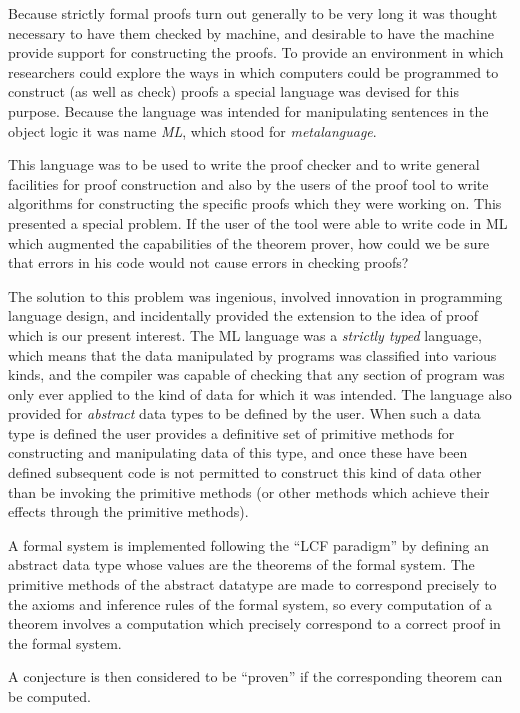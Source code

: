 Because strictly formal proofs turn out generally to be very long it was thought necessary to have them checked by machine, and desirable to have the machine provide support for constructing the proofs.
To provide an environment in which researchers could explore the ways in which computers could be programmed to construct (as well as check) proofs a special language was devised for this purpose.
Because the language was intended for manipulating sentences in the object logic it was name {\it ML}, which stood for {\it metalanguage}.

This language was to be used to write the proof checker and to write general facilities for proof construction and also by the users of the proof tool to write algorithms for constructing the specific proofs which they were working on.
This presented a special problem.
If the user of the tool were able to write code in ML which augmented the capabilities of the theorem prover, how could we be sure that errors in his code would not cause errors in checking proofs?

The solution to this problem was ingenious, involved innovation in programming language design, and incidentally provided the extension to the idea of proof which is our present interest.
The ML language was a {\it strictly typed} language, which means that the data manipulated by programs was classified into various kinds, and the compiler was capable of checking that any section of program was only ever applied to the kind of data for which it was intended.
The language also provided for {\it abstract} data types to be defined by the user.
When such a data type is defined the user provides a definitive set of primitive methods for constructing and manipulating data of this type, and once these have been defined subsequent code is not permitted to construct this kind of data other than be invoking the primitive methods (or other methods which achieve their effects through the primitive methods).

A formal system is implemented following the ``LCF paradigm'' by defining an abstract data type whose values are the theorems of the formal system.
The primitive methods of the abstract datatype are made to correspond precisely to the axioms and inference rules of the formal system, so every computation of a theorem involves a computation which precisely correspond to a correct proof in the formal system.

A conjecture is then considered to be ``proven'' if the corresponding theorem can be computed.

